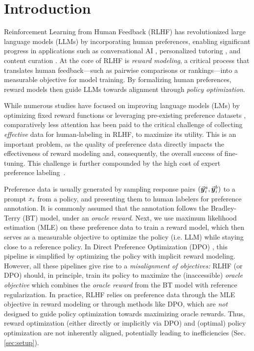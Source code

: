 \section{Introduction}

Reinforcement Learning from Human Feedback (RLHF) \citep{ouyang2022training} has revolutionized large language models (LLMs) by incorporating human preferences, enabling significant progress in applications such as conversational AI \citep{achiam2023gpt}, personalized tutoring \citep{limo2023personalized}, and content curation \citep{yue2024inference}. At the core of RLHF is {\em reward modeling}, a critical process that translates human feedback—such as pairwise comparisons or rankings—into a measurable objective for model training. By formalizing human preferences, reward models then guide LLMs towards alignment through {\em policy optimization}. 
  

While numerous studies have focused on improving language models (LMs) by optimizing fixed reward functions \citep{dongraft, liustatistical} %
or leveraging pre-existing preference datasets \citep{ethayarajh2024kto, azar2024general, xu2024contrastive}, comparatively less attention has been paid to the critical challenge of collecting {\em effective}  data for human-labeling in RLHF, to maximize its utility.
This is an important problem, as the quality of preference data directly impacts the effectiveness of reward modeling and, consequently, the overall success of fine-tuning. 
This challenge is further compounded by the high cost of expert preference labeling~\citep{lightman2023letsverifystepstep}.

Preference data is usually generated by sampling response pairs $(\vec{\boldsymbol{y}}\!\,^a_{i}, \vec{\boldsymbol{y}}\!\,^b_{i})$ to a prompt $ x_{i}$ from a policy, and presenting them to human labelers for preference annotation. It is commonly assumed that the annotation follows the Bradley-Terry (BT) model, under an \emph{oracle reward}. Next, we use maximum likelihood estimation (MLE) on these preference data to train a reward model, which then serves as a measurable objective to optimize the policy (i.e. LLM) while staying close to a reference policy. In 
Direct Preference Optimization (DPO) \citep{rafailov2023direct}, this pipeline is simplified by optimizing the policy with implicit reward modeling.
However, all these pipelines give rise to a {
\em misalignment of objectives:} RLHF (or DPO) should, in principle, train its policy to maximize the (inaccessible) \emph{oracle objective} which combines the \emph{oracle reward} from the BT model with reference regularization. In practice, RLHF relies on preference data through the MLE objective in reward modeling or through methods like DPO, which are \emph{not} designed to guide policy optimization towards maximizing oracle rewards. Thus, reward optimization (either directly or implicitly via DPO) and (optimal) policy optimization are not inherently aligned, potentially leading to inefficiencies (Sec. \ref{sec:setup}).

